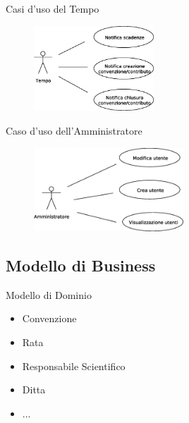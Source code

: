   \begin{frame}{Casi d'uso del Tempo}
    \begin{figure}[h]
      \label{use_case_diag_time}
      \centering
      \includegraphics[width = 0.4\textwidth]{images/casi_uso_tempo.eps}
    \end{figure}
  \end{frame}
  
  \begin{frame}{Caso d'uso dell'Amministratore}
    \begin{figure}
     \centering
           \includegraphics[width = 0.5\textwidth]{images/casi_uso_amministratore.eps}
    \end{figure}

  \end{frame}



  
  \subsection{Modello di Business}
  \begin{frame}{Modello di Dominio}
     \begin{itemize}
      \item Convenzione
      \item Rata
      \item Responsabile Scientifico
      \item Ditta
      \item ...
     \end{itemize}

   
  \end{frame}
  

